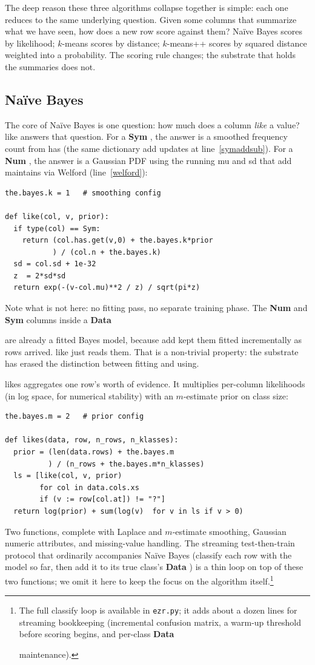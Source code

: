 \documentclass[AMA,STIX2COL]{WileyNJDv5}
\newcommand{\cls}[1]{%
  \setlength{\fboxsep}{1.5pt}%
  \colorbox{clsbg}{\sffamily\bfseries{#1}}%
}
\begin{document}
The deep reason these three algorithms collapse together is
simple: each one reduces to the same underlying question. Given
some columns that summarize what we have seen, how does a new
row score against them? Naïve Bayes scores by likelihood;
$k$-means scores by distance; $k$-means++ scores by squared
distance weighted into a probability. The scoring rule changes;
the substrate that holds the summaries does not.

\subsection{Naïve Bayes}

The core of Naïve Bayes is one question: how much does a column
{\em like} a value? \textsf{like} answers that question. For a
\cls{Sym}, the answer is a smoothed frequency count from
\textsf{has} (the same dictionary \textsf{add} updates at
line~\ref{symaddsub}). For a \cls{Num}, the answer is a Gaussian
PDF using the running \textsf{mu} and \textsf{sd} that
\textsf{add} maintains via Welford (line~\ref{welford}):

\begin{verbatim}
the.bayes.k = 1   # smoothing config

def like(col, v, prior):
  if type(col) == Sym:
    return (col.has.get(v,0) + the.bayes.k*prior
           ) / (col.n + the.bayes.k)
  sd = col.sd + 1e-32
  z  = 2*sd*sd
  return exp(-(v-col.mu)**2 / z) / sqrt(pi*z)
\end{verbatim}
Note what is not here: no fitting pass, no separate training
phase. The \cls{Num} and \cls{Sym} columns inside a \cls{Data}
are already a fitted Bayes model, because \textsf{add} kept them
fitted incrementally as rows arrived. \textsf{like} just reads
them. That is a non-trivial property: the substrate has erased
the distinction between fitting and using.

\textsf{likes} aggregates one row's worth of evidence. It
multiplies per-column likelihoods (in log space, for numerical
stability) with an $m$-estimate prior on class size:

\begin{verbatim}
the.bayes.m = 2   # prior config

def likes(data, row, n_rows, n_klasses):
  prior = (len(data.rows) + the.bayes.m
          ) / (n_rows + the.bayes.m*n_klasses)
  ls = [like(col, v, prior)
        for col in data.cols.xs
        if (v := row[col.at]) != "?"]
  return log(prior) + sum(log(v)  for v in ls if v > 0)
\end{verbatim}
Two functions, complete with Laplace and $m$-estimate smoothing,
Gaussian numeric attributes, and missing-value handling. The
streaming test-then-train protocol that ordinarily accompanies
Naïve Bayes (classify each row with the model so far, then add
it to its true class's \cls{Data}) is a thin loop on top of
these two functions; we omit it here to keep the focus on the
algorithm itself.\footnote{The full \textsf{classify} loop is
available in \texttt{ezr.py}; it adds about a dozen lines for
streaming bookkeeping (incremental confusion matrix, a warm-up
threshold before scoring begins, and per-class \cls{Data}
maintenance).}
\end{document}
